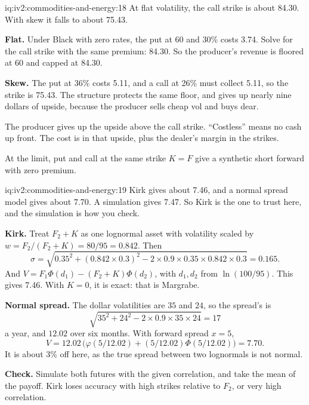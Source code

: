 \begin{solution}{iq:iv2:commodities-and-energy:18}
At flat volatility, the call strike is about 84.30. With skew it falls to about 75.43.

\textbf{Flat.} Under Black with zero rates, the put at 60 and 30\% costs 3.74. Solve for the call strike with the same premium: 84.30. So the producer's revenue is floored at 60 and capped at 84.30.

\textbf{Skew.} The put at 36\% costs 5.11, and a call at 26\% must collect 5.11, so the strike is 75.43. The structure protects the same floor, and gives up nearly nine dollars of upside, because the producer sells cheap vol and buys dear.

The producer gives up the upside above the call strike. ``Costless'' means no cash up front. The cost is in that upside, plus the dealer's margin in the strikes.

At the limit, put and call at the same strike $K = F$ give a synthetic short forward with zero premium.

\end{solution}

\begin{solution}{iq:iv2:commodities-and-energy:19}
Kirk gives about 7.46, and a normal spread model gives about 7.70. A simulation gives 7.47. So Kirk is the one to trust here, and the simulation is how you check.

\textbf{Kirk.} Treat $F_2 + K$ as one lognormal asset with volatility scaled by $w = F_2/(F_2 + K) = 80/95 = 0.842$. Then
\[
\sigma = \sqrt{0.35^2 + (0.842 \times 0.3)^2 - 2 \times 0.9 \times 0.35 \times 0.842 \times 0.3} = 0.165.
\]
And $V = F_1\Phi(d_1) - (F_2 + K)\Phi(d_2)$, with $d_1, d_2$ from $\ln(100/95)$. This gives 7.46. With $K = 0$, it is exact: that is Margrabe.

\textbf{Normal spread.} The dollar volatilities are $35$ and $24$, so the spread's is
\[
\sqrt{35^2 + 24^2 - 2 \times 0.9 \times 35 \times 24} = 17
\]
a year, and $12.02$ over six months. With forward spread $x = 5$,
\[
V = 12.02\,\bigl(\varphi(5/12.02) + (5/12.02)\Phi(5/12.02)\bigr) = 7.70.
\]
It is about 3\% off here, as the true spread between two lognormals is not normal.

\textbf{Check.} Simulate both futures with the given correlation, and take the mean of the payoff. Kirk loses accuracy with high strikes relative to $F_2$, or very high correlation.

\end{solution}

